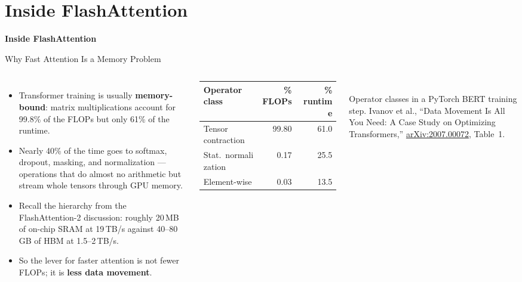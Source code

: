 \section{Inside FlashAttention}
\begin{frame}{}
    \LARGE \textbf{Inside FlashAttention}
\end{frame}

\begin{frame}{Why Fast Attention Is a Memory Problem}
    \begin{columns}[T,onlytextwidth]
        \begin{itemize}\itemsep0.5em
            \item Transformer training is usually \textbf{memory-bound}: matrix multiplications account for 99.8\% of the FLOPs but only 61\% of the runtime.
            \item Nearly 40\% of the time goes to softmax, dropout, masking, and normalization --- operations that do almost no arithmetic but stream whole tensors through GPU memory.
            \item Recall the hierarchy from the FlashAttention-2 discussion: roughly 20\,MB of on-chip SRAM at 19\,TB/s against 40--80\,GB of HBM at 1.5--2\,TB/s.
            \item So the lever for faster attention is not fewer FLOPs; it is \textbf{less data movement}.
        \end{itemize}
        \centering
        \vspace{1.5em}
        {\footnotesize
        \begin{tabular}{lrr}
            \toprule
            Operator class & \% FLOPs & \% runtime \\
            \midrule
            Tensor contraction & 99.80 & 61.0 \\
            Stat.\ normalization & 0.17 & 25.5 \\
            Element-wise & 0.03 & 13.5 \\
            \bottomrule
        \end{tabular}}\\[0.8em]
        {\scriptsize Operator classes in a PyTorch BERT training step. Ivanov et al., ``Data Movement Is All You Need: A Case Study on Optimizing Transformers,'' \href{https://arxiv.org/abs/2007.00072}{arXiv:2007.00072}, Table~1.}
    \end{columns}
\end{frame}

